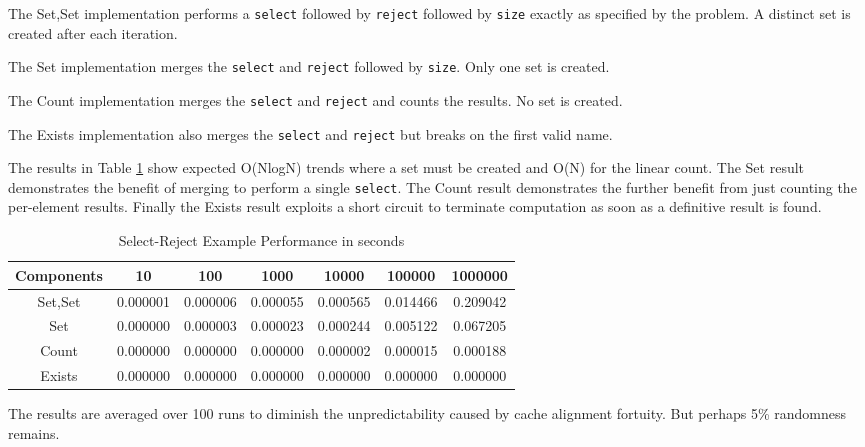 \documentclass[
]{ceurart}
\begin{document}
The Set,Set implementation performs a \verb!select! followed by \verb!reject! followed by \verb!size! exactly as specified by the problem. A distinct set is created after each iteration.

The Set implementation merges the \verb!select! and \verb!reject! followed by \verb!size!. Only one set is created.

The Count implementation merges the \verb!select! and \verb!reject! and counts the results. No set is created.

The Exists implementation also merges the \verb!select! and \verb!reject! but breaks on the first valid name.

The results in Table \ref{tab:SelectRejectPerformance} show expected O(NlogN) trends where a set must be created and O(N) for the linear count. The Set result demonstrates the benefit of merging to perform a single \verb!select!. The Count result demonstrates the further benefit from just counting the per-element results. Finally the Exists result exploits a short circuit to terminate computation as soon as a definitive result is found.  

\begin{table}
\begin{tabular}{ c | c | c | c | c | c | c }
Components & 10 & 100 & 1000 & 10000 & 100000 & 1000000 \\
\hline
Set,Set & 0.000001 &  0.000006 &  0.000055 &  0.000565 &  0.014466 &  0.209042 \\
Set &  0.000000 &  0.000003 &  0.000023 &  0.000244 &  0.005122 &  0.067205 \\
Count &  0.000000 &  0.000000 &  0.000000 &  0.000002 &  0.000015 &  0.000188 \\
Exists &  0.000000 &  0.000000 &  0.000000 &  0.000000 &  0.000000 &  0.000000 \\
\end{tabular}
\caption{Select-Reject Example Performance in seconds}
\label{tab:SelectRejectPerformance}
\end{table}

The results are averaged over 100 runs to diminish the unpredictability caused by cache alignment fortuity. But perhaps 5\% randomness remains.%
\end{document}

